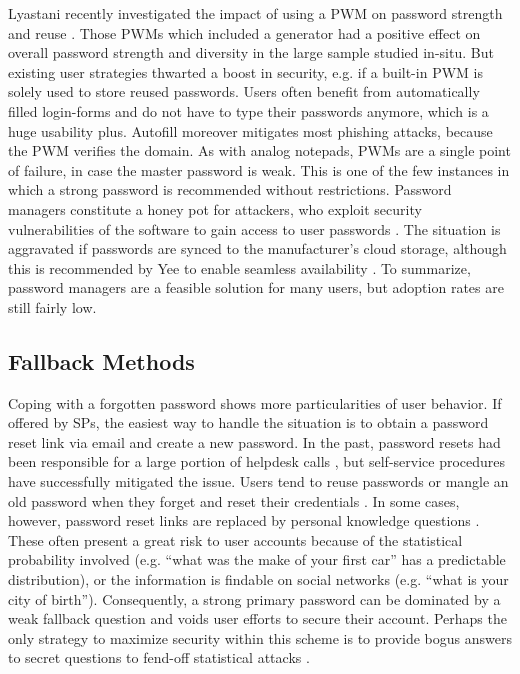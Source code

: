 	Lyastani \etal recently investigated the impact of using a PWM on password strength and reuse \cite{Lyastani2017ImpactPWMPasswordStrength}. Those \glspl{PWM} which included a generator had a positive effect on overall password strength and diversity in the large sample studied in-situ. But existing user strategies thwarted a boost in security, e.g. if a built-in \gls{PWM} is solely used to store reused passwords. Users often benefit from automatically filled login-forms and do not have to type their passwords anymore, which is a huge usability plus. Autofill moreover mitigates most phishing attacks, because the \gls{PWM} verifies the domain. As with analog notepads, PWMs are a single point of failure, in case the master password is weak. This is one of the few instances in which a strong password is recommended without restrictions. Password managers constitute a honey pot for attackers, who exploit security vulnerabilities of the software to gain access to user passwords \cite{Bonneau2012ReplacePasswords}. The situation is aggravated if passwords are synced to the manufacturer's cloud storage, although this is recommended by Yee to enable seamless availability \cite{Yee2006Passpet}. To summarize, password managers are a feasible solution for many users, but adoption rates are still fairly low. 

	\subsection{Fallback Methods}
	Coping with a forgotten password shows more particularities of user behavior. If offered by \glspl{SP}, the easiest way to handle the situation is to obtain a password reset link via email and create a new password. In the past, password resets had been responsible for a large portion of helpdesk calls \cite{Sasse2001WeakestLink}, but self-service procedures have successfully mitigated the issue. Users tend to reuse passwords or mangle an old password when they forget and reset their credentials \cite{Stobert2014PasswordLifeCycle}. In some cases, however, password reset links are replaced by personal knowledge questions \cite{Bonneau2015SecretsLies}. These often present a great risk to user accounts because of the statistical probability involved (e.g. ``what was the make of your first car'' has a predictable distribution), or the information is findable on social networks (e.g. ``what is your city of birth''). Consequently, a strong primary password can be dominated by a weak fallback question and voids user efforts to secure their account. Perhaps the only strategy to maximize security within this scheme is to provide bogus answers to secret questions to fend-off statistical attacks . 

